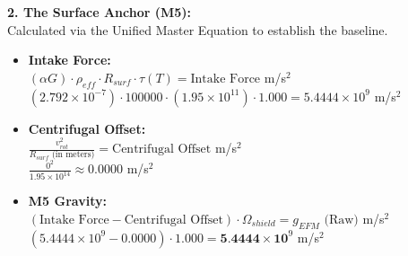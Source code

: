 \documentclass[11pt, a4paper]{article}
\begin{document}
  \vspace{1.0em}
  \noindent \textbf{2. The Surface Anchor (M5):} \\
  \hspace*{1em} Calculated via the Unified Master Equation to establish the baseline.
  \begin{itemize}
    \item \textbf{Intake Force:} \\[0.5em]
    \hspace*{2em} $(\alpha G) \cdot \rho_{eff} \cdot R_{surf} \cdot \tau(T) = \text{Intake Force}$ m/s$^2$ \\[1em]
    \hspace*{2em} $(2.792 \times 10^{-7}) \cdot 100000 \cdot (1.95 \times 10^{11}) \cdot 1.000 = 5.4444 \times 10^9$ m/s$^2$
    
    \item \textbf{Centrifugal Offset:} \\[0.5em]
    \hspace*{2em} $\frac{v_{rot}^2}{R_{surf} \text{ (in meters)}} = \text{Centrifugal Offset}$ m/s$^2$ \\[1em]
    \hspace*{2em} $\frac{0^2}{1.95 \times 10^{14}} \approx 0.0000$ m/s$^2$
    
    \item \textbf{M5 Gravity:} \\[0.5em]
    \hspace*{2em} $(\text{Intake Force} - \text{Centrifugal Offset}) \cdot \Omega_{shield} = g_{EFM} \text{ (Raw)}$ m/s$^2$ \\[1em]
    \hspace*{2em} $(5.4444 \times 10^9 - 0.0000) \cdot 1.000 = \textbf{5.4444} \times \textbf{10}^9$ m/s$^2$
  \end{itemize}
\end{document}
